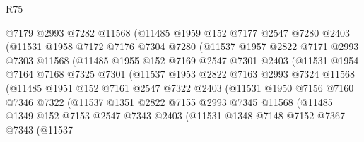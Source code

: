 \begin{lexlean}{R75}
\begin{coremodule}
                @7179
                @2993
                @7282
                @11568
                (@11485
                  @1959
                  @152
                  @7177
                  @2547
                  @7280
                  @2403
                  (@11531
                    @1958
                    @7172
                    @7176
                    @7304
                    @7280
                    (@11537
                      @1957
                      @2822
                      @7171
                      @2993
                      @7303
                      @11568
                      (@11485
                        @1955
                        @152
                        @7169
                        @2547
                        @7301
                        @2403
                        (@11531
                          @1954
                          @7164
                          @7168
                          @7325
                          @7301
                          (@11537
                            @1953
                            @2822
                            @7163
                            @2993
                            @7324
                            @11568
                            (@11485
                              @1951
                              @152
                              @7161
                              @2547
                              @7322
                              @2403
                              (@11531
                                @1950
                                @7156
                                @7160
                                @7346
                                @7322
                                (@11537
                                  @1351
                                  @2822
                                  @7155
                                  @2993
                                  @7345
                                  @11568
                                  (@11485
                                    @1349
                                    @152
                                    @7153
                                    @2547
                                    @7343
                                    @2403
                                    (@11531
                                      @1348
                                      @7148
                                      @7152
                                      @7367
                                      @7343
                                      (@11537

\end{coremodule}
\end{lexlean}
